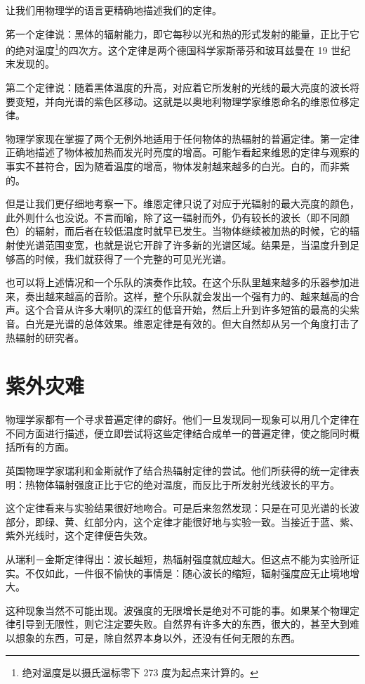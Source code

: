 让我们用物理学的语言更精确地描述我们的定律。

笫一个定律说：黑体的辐射能力，即它每秒以光和热的形式发射的能量，正比于它的绝对温度\footnote{绝对温度是以摄氏温标零下 273 度为起点来计算的。}的四次方。这个定律是两个德国科学家斯蒂芬和玻耳兹曼在 19 世纪末发现的。

第二个定律说：随着黑体温度的升高，对应着它所发射的光线的最大亮度的波长将要变短，并向光谱的紫色区移动。这就是以奥地利物理学家维恩命名的维恩位移定律。

物理学家现在掌握了两个无例外地适用于任何物体的热辐射的普遍定律。第一定律正确地描述了物体被加热而发光时亮度的增高。可能乍看起来维恩的定律与观察的事实不甚符合，因为随着温度的增高，物体发射越来越多的白光。白的，而非紫的。

但是让我们更仔细地考察一下。维恩定律只说了对应于光辐射的最大亮度的颜色，此外则什么也没说。不言而喻，除了这一辐射而外，仍有较长的波长（即不同颜色）的辐射，而后者在较低温度时就早已发生。当物体继续被加热的时候，它的辐射使光谱范围变宽，也就是说它开辟了许多新的光谱区域。结果是，当温度升到足够高的时候，我们就获得了一个完整的可见光光谱。

也可以将上述情况和一个乐队的演奏作比较。在这个乐队里越来越多的乐器参加进来，奏出越来越高的音阶。这样，整个乐队就会发出一个强有力的、越来越高的合声。这个合音从许多大喇叭的深红的低音开始，然后上升到许多短笛的最高的尖紫音。白光是光谱的总体效果。维恩定律是有效的。但大自然却从另一个角度打击了热辐射的研究者。

\section{紫外灾难}

物理学家都有一个寻求普遍定律的癖好。他们一旦发现同一现象可以用几个定律在不同方面进行描述，便立即尝试将这些定律结合成单一的普遍定律，使之能同时概括所有的方面。

英国物理学家瑞利和金斯就作了结合热辐射定律的尝试。他们所获得的统一定律表明：热物体辐射强度正比于它的绝对温度，而反比于所发射光线波长的平方。

这个定律看来与实验结果很好地吻合。可是后来忽然发现：只是在可见光谱的长波部分，即绿、黄、红部分内，这个定律才能很好地与实验一致。当接近于蓝、紫、紫外光线时，这个定律便告失效。

从瑞利－金斯定律得出：波长越短，热辐射强度就应越大。但这点不能为实验所证实。不仅如此，一件很不愉快的事情是：随心波长的缩短，辐射强度应无止境地增大。

这种现象当然不可能出现。波强度的无限增长是绝对不可能的事。如果某个物理定律引导到无限性，则它注定要失败。自然界有许多大的东西，很大的，甚至大到难以想象的东西，可是，除自然界本身以外，还没有任何无限的东西。

